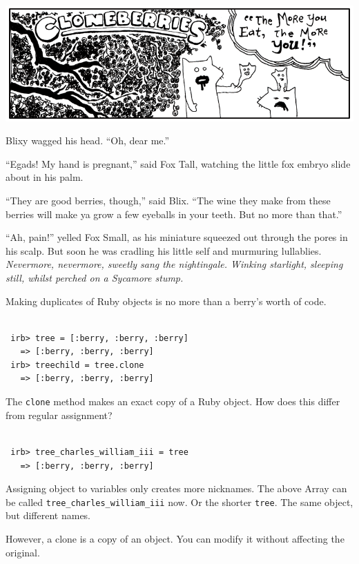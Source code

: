 \documentclass[10pt,twoside]{report}
\begin{document}
	\includegraphics[width=1.0\textwidth]{cache/74.png}

Blixy wagged his head.  ``Oh, dear me.''

``Egads! My hand is pregnant,'' said Fox Tall, watching the little fox
embryo slide about in his palm.

``They are good berries, though,'' said Blix.  ``The wine they make
from these berries will make ya grow a few eyeballs in your teeth.
But no more than that.''

``Ah, pain!'' yelled Fox Small, as his miniature squeezed out through
the pores in his scalp.  But soon he was cradling his little self and
murmuring lullablies.  {\em Nevermore, nevermore, sweetly sang the
  nightingale.  Winking starlight, sleeping still, whilst perched on a
  Sycamore stump.}

Making duplicates of Ruby objects is no more than a berry's worth of
code.


\begin{lstlisting}

 irb> tree = [:berry, :berry, :berry]
   => [:berry, :berry, :berry]
 irb> treechild = tree.clone
   => [:berry, :berry, :berry]

\end{lstlisting}


The \lstinline[breaklines=true]|clone| method makes an exact copy of a
Ruby object.  How does this differ from regular assignment?


\begin{lstlisting}

 irb> tree_charles_william_iii = tree
   => [:berry, :berry, :berry]

\end{lstlisting}


Assigning object to variables only creates more nicknames.  The above
Array can be called
\lstinline[breaklines=true]|tree_charles_william_iii| now.  Or the
shorter \lstinline[breaklines=true]|tree|.  The same object, but
different names.

However, a clone is a copy of an object.  You can modify it without
affecting the original.
\end{document}
